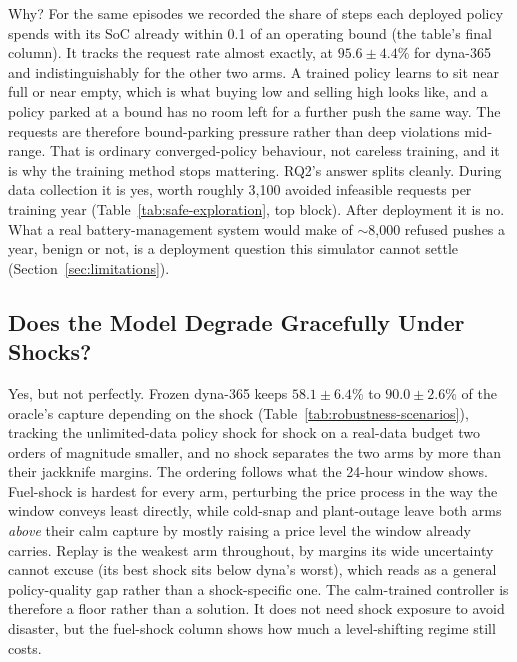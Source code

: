 \documentclass[conference]{IEEEtran}
\begin{document}
Why? For the same episodes we recorded the share of steps each deployed policy spends with its SoC already within 0.1 of an operating bound (the table's final column). It tracks the request rate almost exactly, at $95.6\pm4.4\%$ for dyna-365 and indistinguishably for the other two arms. A trained policy learns to sit near full or near empty, which is what buying low and selling high looks like, and a policy parked at a bound has no room left for a further push the same way. The requests are therefore bound-parking pressure rather than deep violations mid-range. That is ordinary converged-policy behaviour, not careless training, and it is why the training method stops mattering. RQ2's answer splits cleanly. During data collection it is yes, worth roughly 3{,}100 avoided infeasible requests per training year (Table~\ref{tab:safe-exploration}, top block). After deployment it is no. What a real battery-management system would make of $\sim$8{,}000 refused pushes a year, benign or not, is a deployment question this simulator cannot settle (Section~\ref{sec:limitations}).

\subsection{Does the Model Degrade Gracefully Under Shocks?}
\label{sec:results-robustness}

Yes, but not perfectly. Frozen dyna-365 keeps $58.1\pm6.4\%$ to $90.0\pm2.6\%$ of the oracle's capture depending on the shock (Table~\ref{tab:robustness-scenarios}), tracking the unlimited-data policy shock for shock on a real-data budget two orders of magnitude smaller, and no shock separates the two arms by more than their jackknife margins. The ordering follows what the 24-hour window shows. Fuel-shock is hardest for every arm, perturbing the price process in the way the window conveys least directly, while cold-snap and plant-outage leave both arms \emph{above} their calm capture by mostly raising a price level the window already carries. Replay is the weakest arm throughout, by margins its wide uncertainty cannot excuse (its best shock sits below dyna's worst), which reads as a general policy-quality gap rather than a shock-specific one. The calm-trained controller is therefore a floor rather than a solution. It does not need shock exposure to avoid disaster, but the fuel-shock column shows how much a level-shifting regime still costs.
\end{document}
